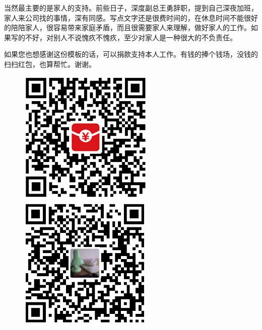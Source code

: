 \documentclass[doctor,openright,twoside]{sjtuthesis}
\theoremstyle{plain}
\theoremstyle{definition}
\theoremstyle{remark}
\theoremstyle{ocrenumbox}
\theoremstyle{plain}
\begin{document}
当然最主要的是家人的支持。前些日子，深度副总王勇辞职，提到自己深夜加班，家人来公司找的事情，深有同感。写点文字还是很费时间的，在休息时间不能很好的陪陪家人，很容易带来家庭矛盾，而且很需要家人来理解，做好家人的工作。如果写的不好，对别人不说愧疚不愧疚，至少对家人是一种很大的不负责任。

如果您也想感谢这份模板的话，可以捐款支持本人工作。有钱的捧个钱场，没钱的扫扫红包，也算帮忙。谢谢。

\begin{figure}[!htp]
  \centering
  \includegraphics[width=.4\linewidth-1cm]{images/zhifubaohongbao.png}
  \hspace{1cm}
  \includegraphics[width=.4\linewidth-1cm]{images/zhifubaozhifu.png}
  \label{fig:zhifubao}
\end{figure}
\end{document}
